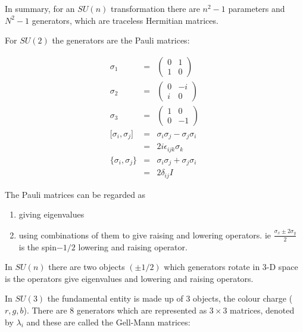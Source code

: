 In summary, for an $SU(n)$ transformation there are $n^2-1$ parameters and $N^2-1$ generators, which are traceless Hermitian matrices.

For $SU(2)$ the generators are the Pauli matrices:

\begin{eqnarray*}
  \sigma_1 & = &
  \left(
  \begin{array}{cc}
    0 & 1 \\
    1 & 0
  \end{array}
  \right)
  \\
  \sigma_2 & = &
  \left(
  \begin{array}{cc}
    0 & -i \\
    i & 0
  \end{array}
  \right)
  \\
  \sigma_3 & = &
  \left(
  \begin{array}{cc}
    1 & 0 \\
    0 & -1
  \end{array}
  \right)
  \\
  \lbrack \sigma_i , \sigma_j \rbrack & = & \sigma_i \sigma_j - \sigma_j \sigma_i \\
  & = & 2i\epsilon_{ijk}\sigma_k \\
  \{ \sigma_i , \sigma_j \} & = & \sigma_i \sigma_j + \sigma_j \sigma_i \\
  & = & 2\delta_{ij}I
\end{eqnarray*}

The Pauli matrices can be regarded as 

\begin{enumerate}
\item giving eigenvalues
\item using combinations of them to give raising and lowering operators.  ie $\frac{\sigma_x \pm 2\sigma_y}{2}$ is the spin$-1/2$ lowering and raising operator.
\end{enumerate}

In $SU(n)$ there are two objects $(\pm 1/2)$ which generators rotate in $3$-D space is the operators give eigenvalues and lowering and raising operators.

In $SU(3)$ the fundamental entity is made up of $3$ objects, the colour charge ($r,g,b$).  There are $8$ generators which are represented as $3\times 3$ matrices, denoted by $\lambda_i$ and these are called the Gell-Mann matrices:

